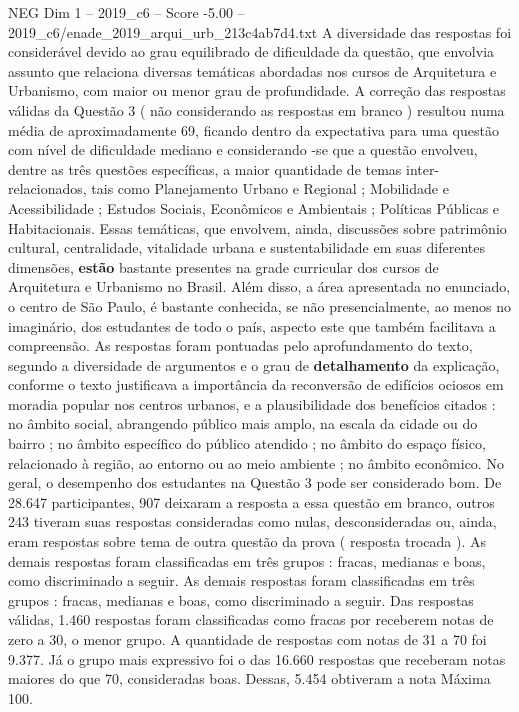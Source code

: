 \begin{textsample}{NEG Dim 1 – 2019\_c6 – Score -5.00 – 2019\_c6/enade\_2019\_arqui\_urb\_213c4ab7d4.txt}
A diversidade das respostas foi considerável devido ao grau equilibrado de dificuldade da questão, que envolvia assunto que relaciona diversas temáticas abordadas nos cursos de Arquitetura e Urbanismo, com maior ou menor grau de profundidade.
A correção das respostas válidas da Questão 3 ( não considerando as respostas em branco ) resultou numa média de aproximadamente 69, ficando dentro da expectativa para uma questão com nível de dificuldade mediano e considerando -se que a questão envolveu, dentre as três questões específicas, a maior quantidade de temas inter-relacionados, tais como Planejamento Urbano e Regional ; Mobilidade e Acessibilidade ; Estudos Sociais, Econômicos e Ambientais ; Políticas Públicas e Habitacionais.
Essas temáticas, que envolvem, ainda, discussões sobre patrimônio cultural, centralidade, vitalidade urbana e sustentabilidade em suas diferentes dimensões, \textbf{estão} bastante presentes na grade curricular dos cursos de Arquitetura e Urbanismo no Brasil.
Além disso, a área apresentada no enunciado, o centro de São Paulo, é bastante conhecida, se não presencialmente, ao menos no imaginário, dos estudantes de todo o país, aspecto este que também facilitava a compreensão.
As respostas foram pontuadas pelo aprofundamento do texto, segundo a diversidade de argumentos e o grau de \textbf{detalhamento} da explicação, conforme o texto justificava a importância da reconversão de edifícios ociosos em moradia popular nos centros urbanos, e a plausibilidade dos benefícios citados : no âmbito social, abrangendo público mais amplo, na escala da cidade ou do bairro ; no âmbito específico do público atendido ; no âmbito do espaço físico, relacionado à região, ao entorno ou ao meio ambiente ; no âmbito econômico.
No geral, o desempenho dos estudantes na Questão 3 pode ser considerado bom.
De 28.647 participantes, 907 deixaram a resposta a essa questão em branco, outros 243 tiveram suas respostas consideradas como nulas, desconsideradas ou, ainda, eram respostas sobre tema de outra questão da prova ( resposta trocada ).
As demais respostas foram classificadas em três grupos : fracas, medianas e boas, como discriminado a seguir.
As demais respostas foram classificadas em três grupos : fracas, medianas e boas, como discriminado a seguir.
Das respostas válidas, 1.460 respostas foram classificadas como fracas por receberem notas de zero a 30, o menor grupo.
A quantidade de respostas com notas de 31 a 70 foi 9.377.
Já o grupo mais expressivo foi o das 16.660 respostas que receberam notas maiores do que 70, consideradas boas.
Dessas, 5.454 obtiveram a nota Máxima 100.

\end{textsample}

